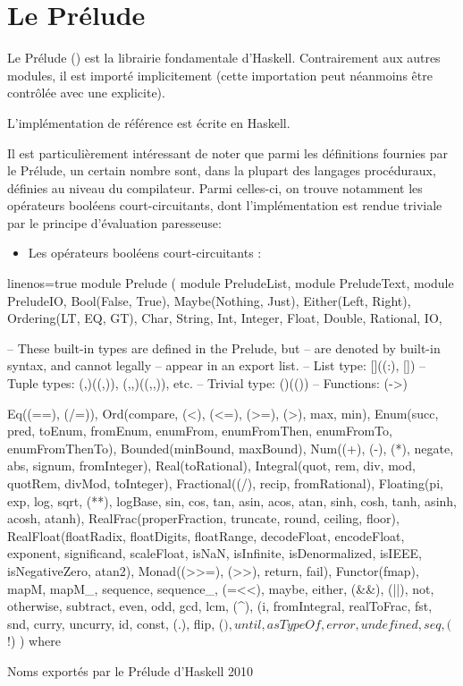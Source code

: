 \section{Le Prélude}
\label{prelude}

Le Prélude () est la librairie fondamentale d'Haskell. Contrairement aux autres modules, il est importé implicitement (cette importation peut néanmoins être contrôlée avec une  explicite).

L'implémentation de référence \parencite[\nopp I, 9]{Haskell2010} est écrite en Haskell.

Il est particulièrement intéressant de noter que parmi les définitions fournies par le Prélude, un certain nombre sont, dans la plupart des langages procéduraux, définies au niveau du compilateur. Parmi celles-ci, on trouve notamment les opérateurs booléens court-circuitants, dont l'implémentation est rendue triviale par le principe d'évaluation paresseuse:

\begin{itemize}
\item Les opérateurs booléens court-circuitants :
\end{itemize}

\begin{hslisting}
\begin{haskellcode*}{linenos=true}
module Prelude (
    module PreludeList, module PreludeText, module PreludeIO,
    Bool(False, True),
    Maybe(Nothing, Just),
    Either(Left, Right),
    Ordering(LT, EQ, GT),
    Char, String, Int, Integer, Float, Double, Rational, IO,

--      These built-in types are defined in the Prelude, but
--      are denoted by built-in syntax, and cannot legally
--      appear in an export list.
--  List type: []((:), [])
--  Tuple types: (,)((,)), (,,)((,,)), etc.
--  Trivial type: ()(())
--  Functions: (->)

    Eq((==), (/=)),
    Ord(compare, (<), (<=), (>=), (>), max, min),
    Enum(succ, pred, toEnum, fromEnum, enumFrom, enumFromThen,
         enumFromTo, enumFromThenTo),
    Bounded(minBound, maxBound),
    Num((+), (-), (*), negate, abs, signum, fromInteger),
    Real(toRational),
    Integral(quot, rem, div, mod, quotRem, divMod, toInteger),
    Fractional((/), recip, fromRational),
    Floating(pi, exp, log, sqrt, (**), logBase, sin, cos, tan,
             asin, acos, atan, sinh, cosh, tanh, asinh, acosh, atanh),
    RealFrac(properFraction, truncate, round, ceiling, floor),
    RealFloat(floatRadix, floatDigits, floatRange, decodeFloat,
              encodeFloat, exponent, significand, scaleFloat, isNaN,
              isInfinite, isDenormalized, isIEEE, isNegativeZero, atan2),
    Monad((>>=), (>>), return, fail),
    Functor(fmap),
    mapM, mapM_, sequence, sequence_, (=<<),
    maybe, either,
    (&&), (||), not, otherwise,
    subtract, even, odd, gcd, lcm, (^), (^^),
    fromIntegral, realToFrac,
    fst, snd, curry, uncurry, id, const, (.), flip, ($), until,
    asTypeOf, error, undefined,
    seq, ($!)
  ) where
\end{haskellcode*}
\caption{Noms exportés par le Prélude d'Haskell 2010 \parencite[\nopp I, 9]{Haskell2010}}
\end{hslisting}
